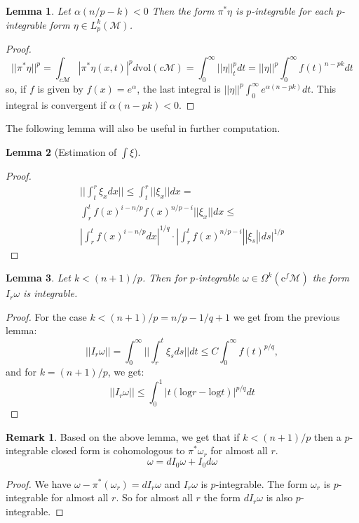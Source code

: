 \documentclass[licencjacka]{pracamgr}
\theoremstyle{definition}
\theoremstyle{definition}
\newtheorem{remark}{Remark}[section]
\theoremstyle{plain}
\newtheorem{lemma}{Lemma}[section]
\theoremstyle{plain}
\begin{document}
\begin{lemma}
Let $ \alpha (n/p - k) < 0 $ Then the form $\pi^\ast \eta$ is
$p$-integrable for each $p$-integrable form $\eta \in
L^k_p(\mathcal{M})$.
\end{lemma}
\begin{proof}
\[
    ||\pi^\ast \eta ||^p = 
    \int_{c \mathcal{M}} |\pi^\ast \eta(x,t)|^p d \mathrm{vol}(c\mathcal{M}) = 
    \int_0^\infty ||\eta||_t^p dt = ||\eta||^p \int_0^\infty f(t)^{n-pk} dt
\]
so, if $f$ is given by $f(x) = e^\alpha$, the last integral is  
$ ||\eta||^p \int_0^\infty e^{\alpha (n-pk)} dt$. This integral is convergent
if $\alpha (n - pk) < 0$.
\end{proof}

The following lemma will also be useful in further computation.
\begin{lemma}[Estimation of $\int \xi$]
\end{lemma}
\begin{proof}  %
\begin{multline*}
    || \int_t^r \xi_x dx || \leq
     \int_t^r || \xi_x || dx  =  \\
     \int_r^t f(x)^{i - n/p} f(x)^{n/p - i} || \xi_x || dx  \leq  \\
   | \int_r^t f(x)^{i - n/p} dx|^{1/q} \cdot
   |\int_r^t f(x)^{n/p - i} || \xi_s || ds |^{1/p}
\end{multline*}
\end{proof}


\begin{lemma}
   Let $k < (n+1)/p$. Then for $p$-integrable $\omega \in
   \Omega^k(\mathrm{c}^f\mathcal{M})$ the form $I_r\omega$ is
   integrable.
\end{lemma}
\begin{proof}
  For the case $k < (n+1)/p = n/p - 1/q + 1$ we get from the previous lemma:
\[
||I_r\omega|| = \int_0^\infty ||\int_r^t \xi_s ds|| dt \leq
 C \int_0^\infty f(t)^{p/q},
\]
and for $k=(n+1)/p$, we get:
\[
  ||I_r\omega|| \leq \int_0^1 | t(\mathrm{log} r - \mathrm{log} t)  |^{p/q} dt
\]
\end{proof}

\begin{remark} %
  Based on the above lemma, we get that if $k<(n+1)/p$ then a $p$-integrable
closed form is cohomologous to $\pi^\ast \omega_r$ for almost all $r$.
\[
    \omega = dI_0\omega + I_0d\omega
\]
\end{remark}
\begin{proof}
  We have $\omega - \pi^\ast(\omega_r) = dI_r\omega$ and $I_r \omega$ is 
$p$-integrable. The form $\omega_r$ is $p$-integrable for almost all $r$.
So for almost all $r$ the form $dI_r\omega$ is also $p$-integrable.
\end{proof}
\end{document}
